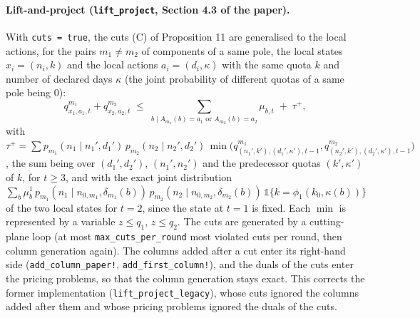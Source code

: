 \documentclass[11pt]{article}
\begin{document}
\paragraph{Lift-and-project (\texttt{lift\_project}, Section 4.3 of the paper).} With
\texttt{cuts = true}, the cuts (C) of Proposition 11 are generalised to the local actions, for the
pairs $m_1 \ne m_2$ of components of a same pole, the local states $x_i = (n_i, k)$ and the local
actions $a_i = (d_i, \kappa)$ with the same quota $k$ and number of declared days $\kappa$ (the
joint probability of different quotas of a same pole being $0$):
\[
  q^{m_1}_{x_1,a_1,t} + q^{m_2}_{x_2,a_2,t} \;\le\;
  \sum_{b \mid A_{m_1}(b) = a_1 \text{ or } A_{m_2}(b) = a_2} \mu_{b,t} \;+\; \tau^+,
\]
with $\tau^+ = \sum p_{m_1}(n_1 \mid n_1', d_1')\, p_{m_2}(n_2 \mid n_2', d_2')\,
\min\big(q^{m_1}_{(n_1',k'),(d_1',\kappa'),t-1}, q^{m_2}_{(n_2',k'),(d_2',\kappa'),t-1}\big)$, the sum
being over $(d_1', d_2')$, $(n_1', n_2')$ and the predecessor quotas $(k', \kappa')$ of $k$, for
$t \ge 3$, and with the exact joint distribution $\sum_b \mu^1_b\, p_{m_1}(n_1 \mid n_{0,m_1},
\delta_{m_1}(b))\, p_{m_2}(n_2 \mid n_{0,m_2}, \delta_{m_2}(b))\, \mathbb 1\{k = \phi_1(k_0,
\kappa(b))\}$ of the two local states for $t = 2$, since the state at $t = 1$ is fixed. Each
$\min$ is represented by a variable $z \le q_1$, $z \le q_2$. The cuts are generated by a
cutting-plane loop (at most \texttt{max\_cuts\_per\_round} most violated cuts per round, then
column generation again). The columns added after a cut enter its right-hand side
(\texttt{add\_column\_paper!}, \texttt{add\_first\_column!}), and the duals of the cuts enter
the pricing problems, so that the column generation stays exact. This corrects the former
implementation (\texttt{lift\_project\_legacy}), whose cuts ignored the columns added after them
and whose pricing problems ignored the duals of the cuts.
\end{document}
